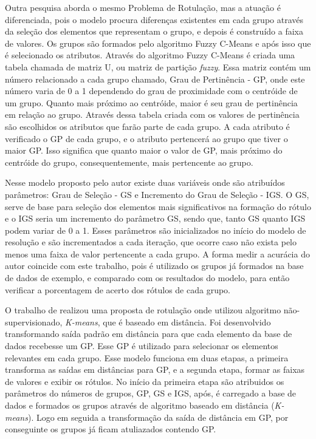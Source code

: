 Outra pesquisa \cite{Filho2015}  aborda o mesmo Problema de Rotulação, mas a atuação é diferenciada, pois o modelo procura diferenças existentes em cada grupo através da seleção dos elementos que representam o grupo, e depois é construído a faixa de valores. Os grupos são formados pelo algoritmo Fuzzy C-Means e após isso que é selecionado os atributos. Através do algoritmo Fuzzy C-Means é criada uma tabela chamada de matriz U, ou matriz de partição \textit{fuzzy}. Essa matriz contém um número relacionado a cada grupo chamado, Grau de Pertinência - GP, onde este número varia de 0 a 1 dependendo do grau de proximidade com o centróide de um grupo. Quanto mais próximo ao centróide, maior é seu grau de pertinência em relação ao grupo. Através dessa tabela criada com os valores de pertinência são escolhidos os atributos que farão parte de cada grupo. A cada atributo é verificado o GP de cada grupo, e o atributo pertencerá ao grupo que tiver o maior GP. Isso significa que quanto maior o valor de GP, mais próximo do centróide do grupo, consequentemente, mais pertencente ao grupo. 

Nesse modelo proposto pelo autor existe duas variáveis onde são atribuídos parâmetros: Grau de Seleção - GS e Incremento do Grau de Seleção - IGS. O GS, serve de base para seleção dos elementos mais significativos na formação do rótulo e o IGS seria um incremento do parâmetro GS, sendo que, tanto GS quanto IGS podem variar de 0 a 1. Esses parâmetros são inicializados no início do modelo de resolução e são incrementados a cada iteração, que ocorre caso não exista pelo menos uma faixa de valor pertencente a cada grupo. A forma medir a acurácia do autor \cite{Filho2015} coincide com este trabalho, pois é utilizado os grupos já formados na base de dados de exemplo, e comparado com os resultados do modelo, para então verificar a porcentagem de acerto dos rótulos de cada grupo. 

O trabalho de \cite{imperes2018} realizou uma proposta de rotulação onde utilizou algoritmo não-supervisionado, \textit{K-means}, que é baseado em distância. Foi desenvolvido transformando saída padrão em distância para que cada elemento da base de dados recebesse um GP. Esse GP é utilizado para selecionar os elementos relevantes em cada grupo. Esse modelo funciona em duas etapas, a primeira transforma as saídas em distâncias para GP, e a segunda etapa, formar as faixas de valores e exibir os rótulos.
No início da primeira etapa são atribuidos os parâmetros do números de grupos, GP, GS e IGS, após, é carregado a base de dados e formados os grupos através de algoritmo baseado em distância (\textit{K-means}). Logo em seguida a transformação da saída de distância em GP, por conseguinte os grupos já ficam atuliazados contendo GP.

